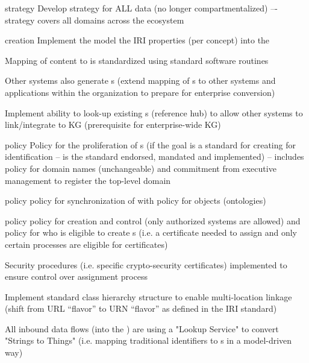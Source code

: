 \begin{members-only}
\begin{scoring}
  \item [strategy] Develop strategy for ALL data (no longer compartmentalized) –- strategy covers all domains across
        the ecosystem
  \item [creation] Implement the model the IRI properties (per concept) into the 
  \item Mapping of content to  is standardized using standard software routines
  \item Other systems also generate s (extend mapping of s to other systems and
        applications within the organization to prepare for enterprise conversion)
  \item Implement ability to look-up existing s (reference hub) to allow other systems to
        link/integrate to KG (prerequisite for enterprise-wide KG)
  \item [policy] Policy for the proliferation of s (if the goal is a standard for creating for
        identification -- is the standard endorsed, mandated and implemented) -- includes policy
        for domain names (unchangeable) and commitment from executive management to register the top-level domain
  \item [policy] policy for synchronization of  with policy for objects (ontologies)
  \item [policy] policy for creation and control (only authorized systems are allowed) and policy for who is
        eligible to create s (i.e. a certificate needed to assign and only certain processes are
        eligible for certificates)

\end{scoring}

\kgmmscoringlevelThree

\begin{scoring}

  \item Security procedures (i.e. specific crypto-security certificates) implemented to ensure control over
         assignment process
  \item Implement standard  class hierarchy structure to enable multi-location linkage (shift from
        URL “flavor” to URN “flavor” as defined in the IRI standard)
  \item All inbound data flows (into the ) are using a "Lookup Service" to convert "Strings to Things"
        (i.e. mapping traditional identifiers to s in a model-driven way)

\end{scoring}

\end{members-only}
